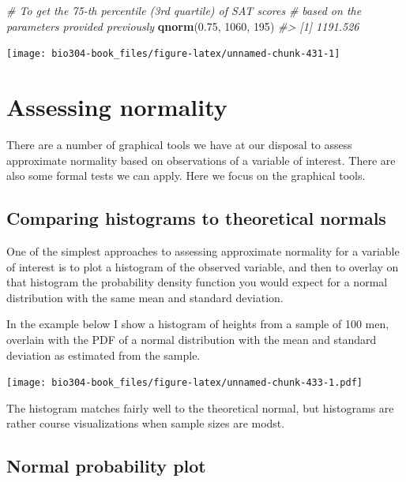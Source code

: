 \documentclass[]{book}
\newenvironment{Shaded}{\begin{snugshade}}{\end{snugshade}}
\newcommand{\CommentTok}[1]{\textcolor[rgb]{0.56,0.35,0.01}{\textit{#1}}}
\newcommand{\DecValTok}[1]{\textcolor[rgb]{0.00,0.00,0.81}{#1}}
\newcommand{\FloatTok}[1]{\textcolor[rgb]{0.00,0.00,0.81}{#1}}
\newcommand{\KeywordTok}[1]{\textcolor[rgb]{0.13,0.29,0.53}{\textbf{#1}}}
\newcommand{\NormalTok}[1]{#1}
\theoremstyle{definition}
\theoremstyle{definition}
\theoremstyle{definition}
\theoremstyle{remark}
\begin{document}
\begin{Shaded}
\begin{Highlighting}[]
\CommentTok{# To get the 75-th percentile (3rd quartile) of SAT scores }
\CommentTok{# based on the parameters provided previously}
\KeywordTok{qnorm}\NormalTok{(}\FloatTok{0.75}\NormalTok{, }\DecValTok{1060}\NormalTok{, }\DecValTok{195}\NormalTok{)}
\CommentTok{#> [1] 1191.526}
\end{Highlighting}
\end{Shaded}

\begin{center}\texttt{[image: bio304-book\_files/figure-latex/unnamed-chunk-431-1]} \end{center}

\hypertarget{assessing-normality}{%
\section{Assessing normality}\label{assessing-normality}}

There are a number of graphical tools we have at our disposal to assess
approximate normality based on observations of a variable of interest.
There are also some formal tests we can apply. Here we focus on the
graphical tools.

\hypertarget{comparing-histograms-to-theoretical-normals}{%
\subsection{Comparing histograms to theoretical
normals}\label{comparing-histograms-to-theoretical-normals}}

One of the simplest approaches to assessing approximate normality for a
variable of interest is to plot a histogram of the observed variable,
and then to overlay on that histogram the probability density function
you would expect for a normal distribution with the same mean and
standard deviation.

In the example below I show a histogram of heights from a sample of 100
men, overlain with the PDF of a normal distribution with the mean and
standard deviation as estimated from the sample.

\texttt{[image: bio304-book\_files/figure-latex/unnamed-chunk-433-1.pdf]}

The histogram matches fairly well to the theoretical normal, but
histograms are rather course visualizations when sample sizes are modst.

\hypertarget{normal-probability-plot}{%
\subsection{Normal probability plot}\label{normal-probability-plot}}
\end{document}
